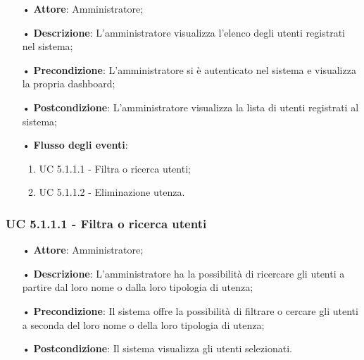 \begin{itemize}
\item[•] \textbf{Attore}: Amministratore;

\item[•] \textbf{Descrizione}: L'amministratore visualizza l'elenco degli utenti registrati nel sistema;

\item[•] \textbf{Precondizione}: L'amministratore si è autenticato nel sistema e visualizza la propria dashboard;

\item[•] \textbf{Postcondizione}: L'amministratore visualizza la lista di utenti registrati al sistema; 

\item[•] \textbf{Flusso degli eventi}:


\begin{enumerate}

\item UC 5.1.1.1 - Filtra o ricerca utenti;
\item UC 5.1.1.2 - Eliminazione utenza.

\end{enumerate}
\end{itemize}

\subsubsection{UC 5.1.1.1 - Filtra o ricerca utenti}
\begin{itemize}

\item[•] \textbf{Attore}: Amministratore;
\item[•] \textbf{Descrizione}: L'amministratore ha la possibilità di ricercare gli utenti a partire dal loro nome o dalla loro tipologia di utenza;
\item[•] \textbf{Precondizione}: Il sistema offre la possibilità di filtrare o cercare gli utenti a seconda del loro nome o della loro tipologia di utenza;
\item[•] \textbf{Postcondizione}: Il sistema visualizza gli utenti selezionati.

\end{itemize}

